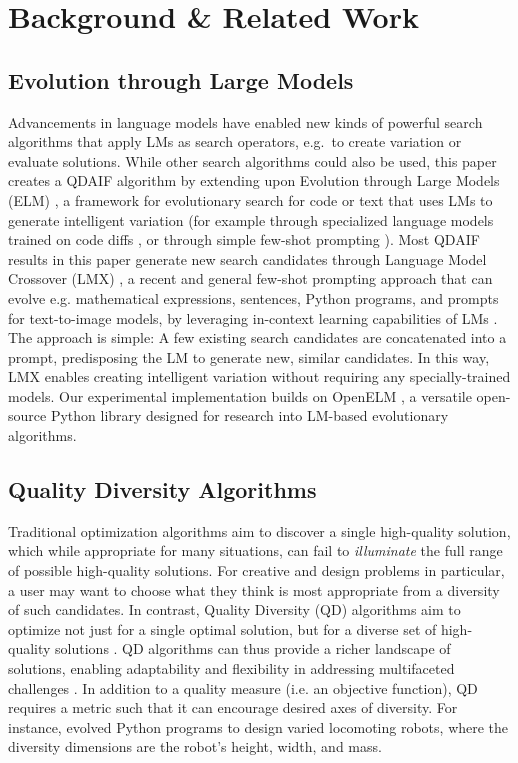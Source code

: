 \section{Background \& Related Work}

\subsection{Evolution through Large Models}
Advancements in language models have enabled new kinds of powerful search algorithms that apply LMs as search operators, e.g.\ to create variation or evaluate solutions. While other search algorithms could also be used, this paper creates a QDAIF algorithm by extending upon Evolution through Large Models (ELM) \citep{lehman2022evolution}, a framework for evolutionary search for code or text that uses LMs to generate intelligent variation (for example through specialized language models trained on code diffs \citep{bradley2023diffmodels}, or through simple few-shot prompting \citep{meyerson2023language,chen2023evoprompting}). Most QDAIF results in this paper generate new search candidates through Language Model Crossover (LMX) \citep{meyerson2023language}, a recent and general few-shot prompting approach that can evolve e.g. mathematical expressions, sentences, Python programs, and prompts for text-to-image models, by leveraging in-context learning capabilities of LMs \citep{brown2020language}. The approach is simple: A few existing search candidates are concatenated into a prompt, predisposing the LM to generate new, similar candidates. In this way, LMX enables creating intelligent variation without requiring any specially-trained models. Our experimental implementation builds on OpenELM \citep{Bradley_OpenELM_2023}, a versatile open-source Python library designed for research into LM-based evolutionary algorithms.

\subsection{Quality Diversity Algorithms}\label{main:qd_background}
Traditional optimization algorithms aim to discover a single high-quality solution, which while appropriate for many situations, can fail to \emph{illuminate} the full range of possible high-quality solutions. For creative and design problems in particular, a user may want to choose what they think is most appropriate from a diversity of such candidates. In contrast, Quality Diversity (QD) algorithms aim to optimize not just for a single optimal solution, but for a diverse set of high-quality solutions \citep{lehman2011evolving, mouret2015illuminating, pugh2016quality, fontaine2021differentiable}. QD algorithms can thus provide a richer landscape of solutions, enabling adaptability and flexibility in addressing multifaceted challenges \citep{cully2015robots}.  In addition to a quality measure (i.e. an objective function), QD requires a metric such that it can encourage desired axes of diversity. For instance, \citet{lehman2022evolution} evolved Python programs to design varied locomoting robots, where the diversity dimensions are the robot's height, width, and mass.

